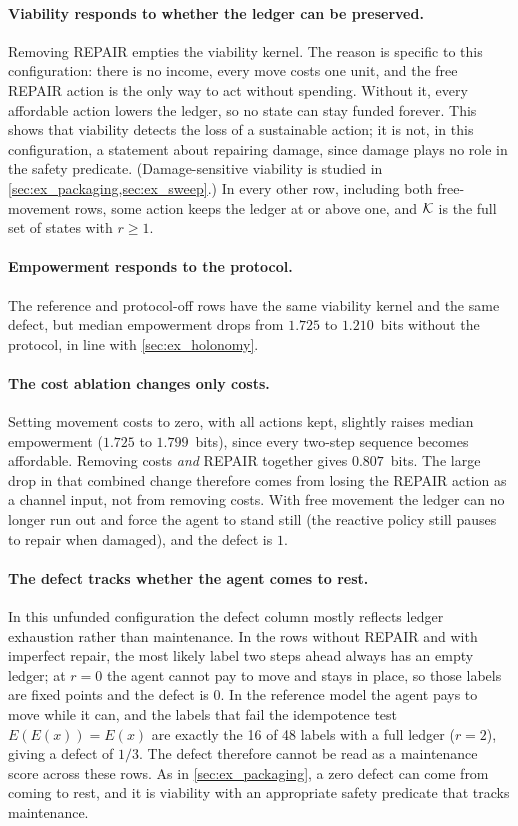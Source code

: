 \paragraph{Viability responds to whether the ledger can be preserved.}
Removing REPAIR empties the viability kernel. The reason is specific to this configuration: there is no income, every move costs one unit, and the free REPAIR action is the only way to act without spending. Without it, every affordable action lowers the ledger, so no state can stay funded forever. This shows that viability detects the loss of a sustainable action; it is not, in this configuration, a statement about repairing damage, since damage plays no role in the safety predicate. (Damage-sensitive viability is studied in \cref{sec:ex_packaging,sec:ex_sweep}.) In every other row, including both free-movement rows, some action keeps the ledger at or above one, and $\mathcal{K}$ is the full set of states with $r\ge1$.

\paragraph{Empowerment responds to the protocol.}
The reference and protocol-off rows have the same viability kernel and the same defect, but median empowerment drops from $1.725$ to $1.210$~bits without the protocol, in line with \cref{sec:ex_holonomy}.

\paragraph{The cost ablation changes only costs.}
Setting movement costs to zero, with all actions kept, slightly raises median empowerment ($1.725$ to $1.799$~bits), since every two-step sequence becomes affordable. Removing costs \emph{and} REPAIR together gives $0.807$~bits. The large drop in that combined change therefore comes from losing the REPAIR action as a channel input, not from removing costs. With free movement the ledger can no longer run out and force the agent to stand still (the reactive policy still pauses to repair when damaged), and the defect is $1$.

\paragraph{The defect tracks whether the agent comes to rest.}
In this unfunded configuration the defect column mostly reflects ledger exhaustion rather than maintenance. In the rows without REPAIR and with imperfect repair, the most likely label two steps ahead always has an empty ledger; at $r=0$ the agent cannot pay to move and stays in place, so those labels are fixed points and the defect is $0$. In the reference model the agent pays to move while it can, and the labels that fail the idempotence test $E(E(x))=E(x)$ are exactly the 16 of 48 labels with a full ledger ($r=2$), giving a defect of $1/3$. The defect therefore cannot be read as a maintenance score across these rows. As in \cref{sec:ex_packaging}, a zero defect can come from coming to rest, and it is viability with an appropriate safety predicate that tracks maintenance.

